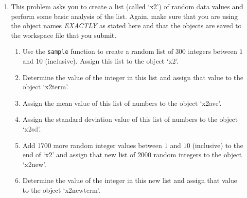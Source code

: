 \documentclass{article}
\begin{document}
\begin{enumerate}
\item This problem asks you to create a list (called `x2') of random data values and perform some basic analysis of the list. Again, make sure that you are using the object names {\em EXACTLY} as stated here and that the objects are saved to the workspace file that you submit.
	\begin{enumerate}
	\item Use the \texttt{sample} function to create a random list of 300 integers between $1$ and $10$ (inclusive). Assign this list to the object `x2'.
	\item Determine the value of the  integer in this list and assign that value to the object `x2term'.
	\item Assign the mean value of this list of numbers to the object `x2ave'.
	\item Assign the standard deviation value of this list of numbers to the object `x2sd'.
	\item Add 1700 more random integer values between $1$ and $10$ (inclusive) to the end of `x2' and assign that new list of 2000 random integers to the object `x2new'.
	\item Determine the value of the  integer in this new list and assign that value to the object `x2newterm'.
	\end{enumerate}
	


\end{enumerate}
\end{document}
